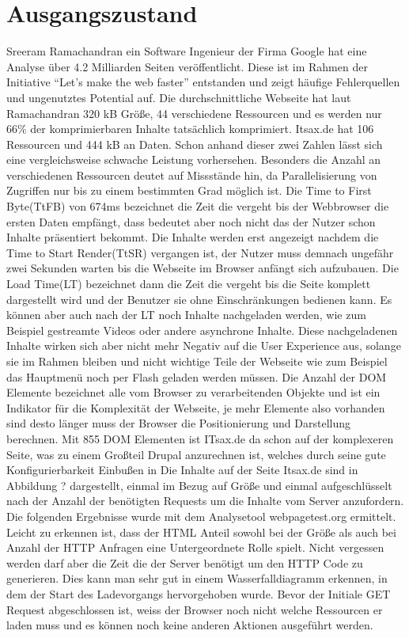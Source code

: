 \section{Ausgangszustand}
Sreeram Ramachandran ein Software Ingenieur der Firma Google hat eine Analyse über 4.2 Milliarden Seiten veröffentlicht. Diese ist im Rahmen der Initiative ``Let's make the web faster'' entstanden und zeigt häufige Fehlerquellen und ungenutztes Potential auf. Die durchschnittliche Webseite hat laut Ramachandran 320 kB Größe, 44 verschiedene Ressourcen und es werden nur 66\% der komprimierbaren Inhalte tatsächlich komprimiert. 
Itsax.de hat 106 Ressourcen und 444 kB an Daten. Schon anhand dieser zwei Zahlen lässt sich eine vergleichsweise schwache Leistung vorhersehen. Besonders die Anzahl an verschiedenen Ressourcen deutet auf Missstände hin, da Parallelisierung von Zugriffen nur bis zu einem bestimmten Grad möglich ist. Die Time to First Byte(TtFB) von 674ms bezeichnet die Zeit die vergeht bis der Webbrowser die ersten Daten empfängt, dass bedeutet aber noch nicht das der Nutzer schon Inhalte präsentiert bekommt. Die Inhalte werden erst angezeigt nachdem die Time to Start Render(TtSR) vergangen ist, der Nutzer muss demnach ungefähr zwei Sekunden warten bis die Webseite im Browser anfängt sich aufzubauen. Die Load Time(LT) bezeichnet dann die Zeit die vergeht bis die Seite komplett dargestellt wird und der Benutzer sie ohne Einschränkungen bedienen kann. Es können  aber auch nach der LT noch Inhalte nachgeladen werden, wie zum Beispiel gestreamte Videos oder andere asynchrone Inhalte. Diese nachgeladenen Inhalte wirken sich aber nicht mehr Negativ auf die User Experience aus, solange sie im Rahmen bleiben und nicht wichtige Teile der Webseite wie zum Beispiel das Hauptmenü noch per Flash geladen werden müssen. Die Anzahl der DOM Elemente bezeichnet alle vom Browser zu verarbeitenden Objekte und ist ein Indikator für die Komplexität der Webseite, je mehr Elemente also vorhanden sind desto länger muss der Browser die Positionierung und Darstellung berechnen. Mit 855 DOM Elementen ist ITsax.de da schon auf der komplexeren Seite, was zu einem Großteil Drupal anzurechnen ist, welches durch seine gute Konfigurierbarkeit Einbußen in    Die Inhalte auf der Seite Itsax.de sind in Abbildung ? dargestellt, einmal im Bezug auf Größe und einmal aufgeschlüsselt nach der Anzahl der benötigten Requests um die Inhalte vom Server anzufordern. Die folgenden Ergebnisse wurde mit dem Analysetool webpagetest.org ermittelt. Leicht zu erkennen ist, dass der HTML Anteil sowohl bei der Größe als auch bei Anzahl der HTTP Anfragen eine Untergeordnete Rolle spielt. Nicht vergessen werden darf aber die Zeit die der Server benötigt um den HTTP Code zu generieren. Dies kann man sehr gut in einem Wasserfalldiagramm erkennen, in dem der Start des Ladevorgangs hervorgehoben wurde. Bevor der Initiale GET Request abgeschlossen ist, weiss der Browser noch nicht welche Ressourcen er laden muss und es können noch keine anderen Aktionen ausgeführt werden.
